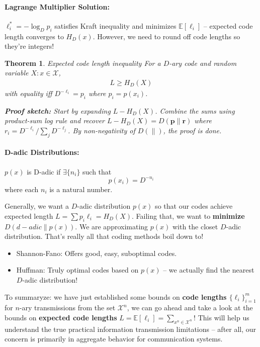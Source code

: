 \documentclass[a4paper,12pt]{report}
\newtheorem{theorem}{Theorem}
\begin{document}
\paragraph{Lagrange Multiplier Solution: } $\ell_i^* = -\log_D p_i$ satisfies
Kraft inequality and minimizes $\mathbb E[\ell_i]$ -- expected code length
converges to $H_D(x)$. However, we need to round off code lengths so they're
integers!

\begin{theorem}{Expected code length inequality}
For a $D$-ary code and random variable $X: x\in \mathcal X$, 
\begin{align}
	L \geq H_D(X)
\end{align}
with equality iff $D^{-\ell_i} = p_i$ where $p_i = p(x_i)$.

\textbf{Proof sketch:} Start by expanding $L - H_D(X)$. Combine the sums using
product-sum log rule and recover $L - H_D(X) = D(\mathbf p \| \mathbf r)$ where
$r_i = D^{-\ell_i}/\sum_j D^{-\ell_j}$. By non-negativity of $D(\|)$, the proof
is done.
\end{theorem}



\paragraph{D-adic Distributions: } $p(x)$ is D-adic if $\exists \{n_i\}$ such
that \begin{equation}
p(x_i) = D^{-n_i}
\end{equation}
where each $n_i$ is a natural number.


Generally, we want a $D$-adic distribution $p(x)$ so that our codes achieve
expected length $L = \sum p_i \ell_i = H_D(X)$. Failing that, we want to
\textbf{minimize $D(d-adic \| p(x))$}. We are approximating $p(x)$ with the
closet $D$-adic distribution. That's really all that coding methods boil down
to!
\begin{itemize}
\item Shannon-Fano: Offers good, easy, suboptimal codes. 
\item Huffman: Truly optimal codes based on $p(x)$ -- we actually find the
nearest $D$-adic distribution!
\end{itemize}


To summaryze: we have just established some bounds on \textbf{code lengths
$\{\ell_i\}_{i=1}^m$} for $n$-ary transmissions from the set $\mathcal X^n$, we
can go ahead and take a look at the bounds on \textbf{expected code lengths} $L
= \mathbb E[\ell_i] = \sum_{x^n\in \mathcal X^n}$! This will help us understand
the true practical information transmission limitations -- after all, our
concern is primarily in aggregate behavior for communication systems.
\end{document}
